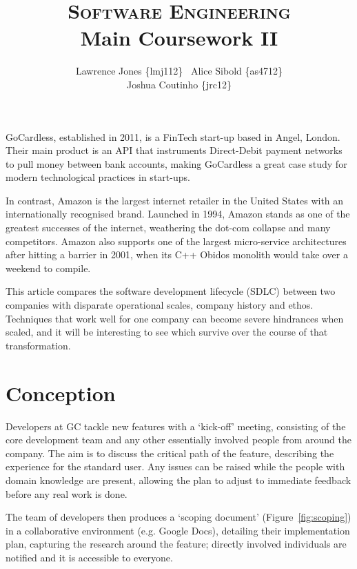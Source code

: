 \documentclass[11pt]{article}
\title{\textsc{Software Engineering}\\Main Coursework II}
\author{Lawrence Jones \{lmj112\} \  Alice Sibold \{as4712\} \\
        Joshua Coutinho \{jrc12\}}
\date{}
\begin{document}
\maketitle


GoCardless, established in 2011, is a FinTech start-up based in Angel, London.
Their main product is an API that instruments Direct-Debit payment networks to
pull money between bank accounts, making GoCardless a great case study for
modern technological practices in start-ups.

In contrast, Amazon is the largest internet retailer in the United States with
an internationally recognised brand. Launched in 1994, Amazon stands as one of
the greatest successes of the internet, weathering the dot-com collapse and many
competitors. Amazon also supports one of the largest micro-service architectures
after hitting a barrier in 2001, when its C++ Obidos monolith would take over a
weekend to compile.

This article compares the software development lifecycle (SDLC) between two
companies with disparate operational scales, company history and ethos.
Techniques that work well for one company can become severe hindrances when
scaled, and it will be interesting to see which survive over the course of that
transformation.

\section{Conception}


Developers at GC tackle new features with a `kick-off' meeting, consisting of
the core development team and any other essentially involved people from around
the company. The aim is to discuss the critical path of the feature, describing
the experience for the standard user.  Any issues can be raised while the people
with domain knowledge are present, allowing the plan to adjust to immediate
feedback before any real work is done.

The team of developers then produces a `scoping document'
(Figure~\ref{fig:scoping}) in a collaborative environment (e.g. Google Docs),
detailing their implementation plan, capturing the research around the feature;
directly involved individuals are notified and it is accessible to everyone.
\end{document}
